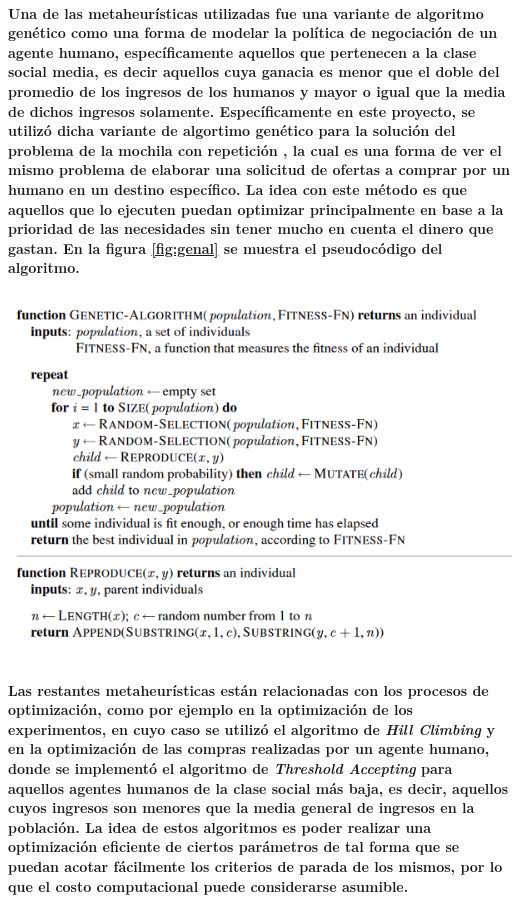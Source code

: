\documentclass[12pt]{amsart}
\begin{document}
\paragraph{Una de las metaheurísticas utilizadas fue una variante de algoritmo genético como una forma de modelar la política de negociación de un agente humano, específicamente aquellos que pertenecen a la clase social media, es decir aquellos cuya ganacia es menor que el doble del promedio de los ingresos de los humanos y mayor o igual que la media de dichos ingresos solamente. Específicamente en este proyecto, se utilizó dicha variante de algortimo genético para la solución del problema de la mochila con repetición \cite{mochilarep}, la cual es una forma de ver el mismo problema de elaborar una solicitud de ofertas a comprar por un humano en un destino específico. La idea con este método es que aquellos que lo ejecuten puedan optimizar principalmente en base a la prioridad de las necesidades sin tener mucho en cuenta el dinero que gastan. En la figura \ref{fig:genal} se muestra el pseudocódigo del algoritmo.}

\begin{center}
	\includegraphics[scale=0.8]{./images/genal.png}
	\label{fig:genal}
\end{center}

\paragraph{Las restantes metaheurísticas están relacionadas con los procesos de optimización, como por ejemplo en la optimización de los experimentos, en cuyo caso se utilizó el algoritmo de \textit{Hill Climbing} \cite{hillclimb} y en la optimización de las compras realizadas por un agente humano, donde se implementó el algoritmo de \textit{Threshold Accepting} \cite{taccept} para aquellos agentes humanos de la clase social más baja, es decir, aquellos cuyos ingresos son menores que la media general de ingresos en la población. La idea de estos algoritmos es poder realizar una optimización eficiente de ciertos parámetros de tal forma que se puedan acotar fácilmente los criterios de parada de los mismos, por lo que el costo computacional puede considerarse asumible.}
\end{document}
